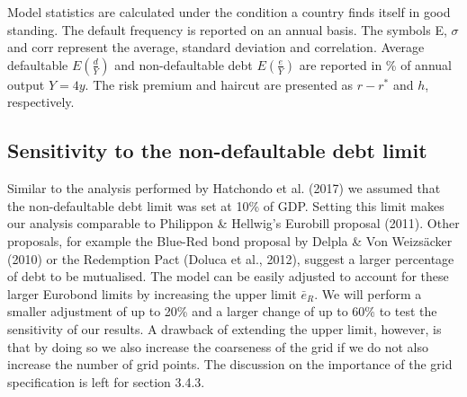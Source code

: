\begin{table}[H]
{\begin{tabular}{lm{2.1cm}cccccc}
\end{tabular}}    
\begin{tablenotes}
      \footnotesize
      \item Model statistics are calculated under the condition a country finds itself in good standing. The default frequency is reported on an annual basis. The symbols E, $\sigma$ and corr represent the average, standard deviation and correlation. Average defaultable $E(\frac{d}{Y})$ and non-defaultable debt $E(\frac{e}{Y})$ are reported in \% of annual output $Y = 4y$. The risk premium and haircut are presented as $r-r^*$ and $h$, respectively.
    \end{tablenotes}
\end{table}
\subsection{Sensitivity to the non-defaultable debt limit}
Similar to the analysis performed by Hatchondo et al. (2017) we assumed that the non-defaultable debt limit was set at 10\% of GDP. Setting this limit makes our analysis comparable to Philippon \& Hellwig's Eurobill proposal (2011). Other proposals, for example the Blue-Red bond proposal by Delpla \& Von Weizsäcker (2010) or the Redemption Pact (Doluca et al., 2012), suggest a larger percentage of debt to be mutualised. The model can be easily adjusted to account for these larger Eurobond limits by increasing the upper limit $\bar{e}_R$. We will perform a smaller adjustment of up to 20\% and a larger change of up to 60\% to test the sensitivity of our results. A drawback of extending the upper limit, however, is that by doing so we also increase the coarseness of the grid if we do not also increase the number of grid points. The discussion on the importance of the grid specification is left for section 3.4.3.\\ 

